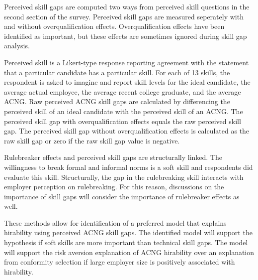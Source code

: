 \documentclass[review]{elsarticle}
\begin{document}
Perceived skill gaps are computed two ways from perceived skill questions in the second section of the survey.
Perceived skill gaps are measured seperately with and without overqualification effects.
Overqualification effects have been identified as important\cite{green2007there, raybould2005over}, but these effects are sometimes ignored during skill gap analysis\cite{blake_2018}.

Perceived skill is a Likert-type response reporting agreement with the statement that a particular candidate has a particular skill.
For each of 13 skills, the respondent is asked to imagine and report skill levels for the ideal candidate,
the average actual employee,
the average recent college graduate,
and the average ACNG.
Raw perceived ACNG skill gaps are calculated by differencing the perceived skill of an ideal candidate with the perceived skill of an ACNG.
The perceived skill gap with overqualification effects equals the raw perceived skill gap.
The perceived skill gap without overqualification effects is calculated as the raw skill gap or zero if the raw skill gap value is negative.

Rulebreaker effects and perceived skill gaps are structurally linked.
The willingness to break formal and informal norms is a soft skill and respondents did evaluate this skill.
Structurally, the gap in the rulebreaking skill interacts with employer perception on rulebreaking.
For this reason, discussions on the importance of skill gaps will consider the importance of rulebreaker effects as well.

These methods allow for identification of a preferred model that explains hirability using perceived ACNG skill gaps.
The identified model will support the hypothesis if soft skills are more important than technical skill gaps. %
The model will support the risk aversion explanation of ACNG hirability over an explanation from conformity selection if large employer size is positively associated with hirability.
\end{document}
